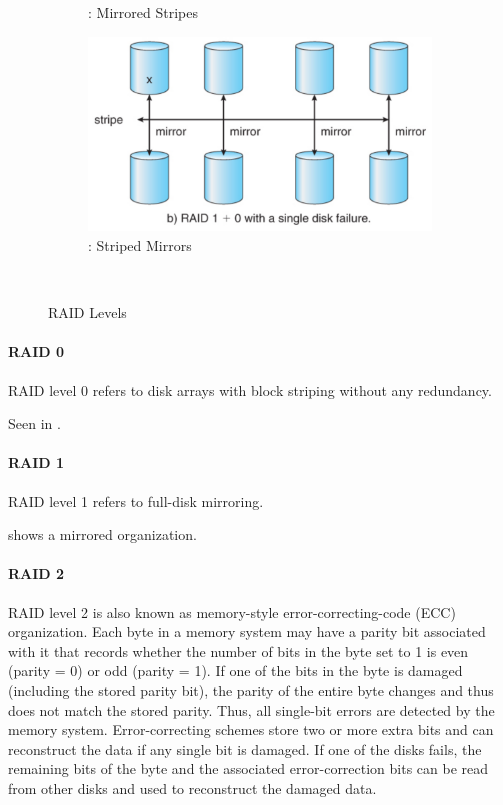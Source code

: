 \begin{figure}[h!tbp]
\begin{subfigure}{0.45\linewidth}
    \caption{: Mirrored Stripes}
    \label{subfig:RAID_01}
  \end{subfigure}
  \begin{subfigure}{0.45\linewidth}
    \centering
    \includegraphics[scale=1.00]{./Drawings/EDAF35-Operating_Systems/RAID_10.png}
    \caption{: Striped Mirrors}
    \label{subfig:RAID_10}
  \end{subfigure} \\
  \caption{RAID Levels}
  \label{fig:RAID_Levels}
\end{figure}

\paragraph{RAID 0}\label{par:RAID_0}
RAID level 0 refers to disk arrays with block striping without any redundancy.

Seen in .

\paragraph{RAID 1}\label{par:RAID_1}
RAID level 1 refers to full-disk mirroring.

 shows a mirrored organization.

\paragraph{RAID 2}\label{par:RAID_2}
RAID level 2 is also known as memory-style error-correcting-code (ECC) organization.
Each byte in a memory system may have a parity bit associated with it that records whether the number of bits in the byte set to 1 is even (parity = 0) or odd (parity = 1).
If one of the bits in the byte is damaged (including the stored parity bit), the parity of the entire byte changes and thus does not match the stored parity.
Thus, all single-bit errors are detected by the memory system.
Error-correcting schemes store two or more extra bits and can reconstruct the data if any single bit is damaged.
If one of the disks fails, the remaining bits of the byte and the associated error-correction bits can be read from other disks and used to reconstruct the damaged data.

